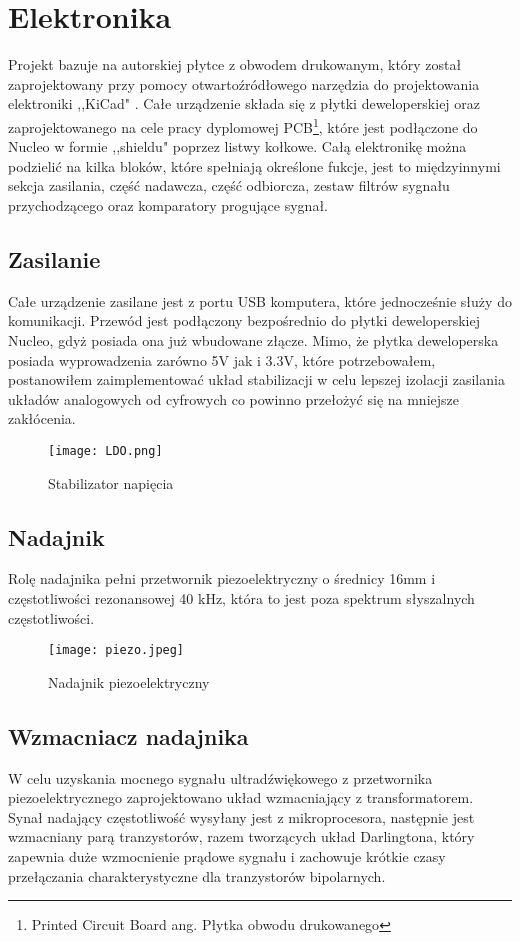 \section{Elektronika}
Projekt bazuje na autorskiej płytce z obwodem drukowanym, który został zaprojektowany przy pomocy 
otwartoźródłowego narzędzia do projektowania elektroniki ,,KiCad" \cite{kicad}. 
Całe urządzenie składa się z płytki deweloperskiej oraz zaprojektowanego na cele pracy dyplomowej 
PCB\footnote[1]{Printed Circuit Board ang. Płytka obwodu drukowanego}, które
jest podłączone do Nucleo w formie ,,shieldu" poprzez listwy kołkowe.
Całą elektronikę można podzielić na kilka bloków, które spełniają określone fukcje, 
jest to międzyinnymi sekcja zasilania, część nadawcza, część odbiorcza, zestaw filtrów sygnału przychodzącego oraz komparatory progujące sygnał.

\subsection{Zasilanie}
Całe urządzenie zasilane jest z portu USB komputera, które jednocześnie służy do komunikacji. 
Przewód jest podłączony bezpośrednio do płytki deweloperskiej Nucleo, gdyż posiada ona już wbudowane złącze. 
Mimo, że płytka deweloperska posiada wyprowadzenia zarówno 5V jak i 3.3V, które potrzebowałem, 
postanowiłem zaimplementować układ stabilizacji w celu lepszej izolacji zasilania układów analogowych od cyfrowych co powinno przełożyć się na mniejsze zakłócenia.
\begin{figure}[ht!]
    \centering
    \texttt{[image: LDO.png]}
    \caption{Stabilizator napięcia}
    \label{fig:ldo}
\end{figure}

\subsection{Nadajnik}
Rolę nadajnika pełni przetwornik piezoelektryczny o średnicy 16mm i częstotliwości rezonansowej 40 \si{kHz}, która to jest poza spektrum słyszalnych częstotliwości.
\begin{figure}[ht!]
    \centering
    \texttt{[image: piezo.jpeg]}
    \caption{Nadajnik piezoelektryczny}
    \label{fig:piezo}
\end{figure}

\subsection{Wzmacniacz nadajnika}
W celu uzyskania mocnego sygnału ultradźwiękowego z przetwornika piezoelektrycznego zaprojektowano układ wzmacniający z transformatorem. 
Synał nadający częstotliwość wysyłany jest z mikroprocesora, następnie jest wzmacniany parą tranzystorów, razem tworzących układ Darlingtona, 
który zapewnia duże wzmocnienie prądowe sygnału i zachowuje krótkie czasy przełączania charakterystyczne dla tranzystorów bipolarnych.

